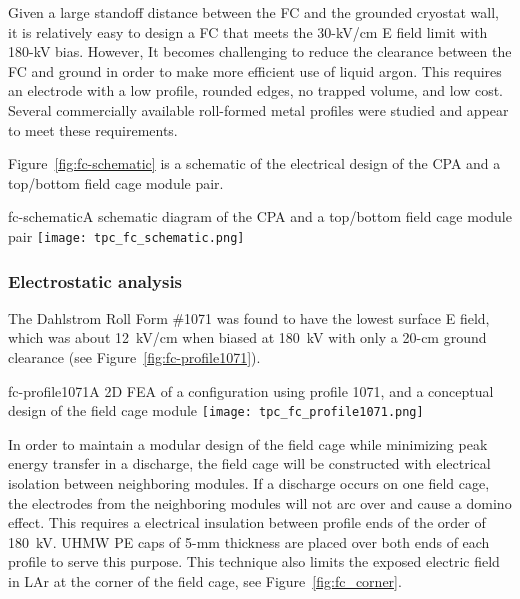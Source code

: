 Given a large standoff distance between the FC and the grounded cryostat wall, it is relatively easy to design a FC that meets the 30-kV/cm E field limit with 180-kV bias.  However, It becomes challenging to reduce the clearance between the FC and ground in order to make more efficient use of liquid argon.  This requires an electrode with a low profile, rounded edges, no trapped volume, and low cost.  Several commercially available roll-formed metal profiles were studied and appear to meet these requirements. 

Figure~\ref{fig:fc-schematic} is a schematic of the electrical design of  the CPA and a top/bottom field cage module pair.

\begin{cdrfigure}{fc-schematic}{A schematic diagram of the CPA and a top/bottom field cage module pair}
\texttt{[image: tpc\_fc\_schematic.png]}
\end{cdrfigure}

\subsubsection{Electrostatic analysis}

The Dahlstrom Roll Form \#1071 was found to have the lowest surface E field, which was about 12~kV/cm when biased at 180~kV with only a 20-cm ground clearance (see Figure~\ref{fig:fc-profile1071}).

\begin{cdrfigure}{fc-profile1071}{A 2D FEA of a configuration using profile 1071, and a conceptual design of the field cage module}
\texttt{[image: tpc\_fc\_profile1071.png]}
\end{cdrfigure}
  
In order to maintain a modular design of the field cage while minimizing peak energy transfer in a discharge, the field cage will be constructed with electrical isolation between neighboring modules. If a discharge occurs on one field cage, the electrodes from the neighboring modules will not arc over and cause a domino effect.  This requires a 
electrical insulation between profile ends of the order of 180~kV.  UHMW PE caps of 5-mm thickness are placed over both ends of each profile to serve this purpose. This technique also limits the exposed electric field in LAr at the corner of the field cage, see Figure~\ref{fig:fc_corner}. 

